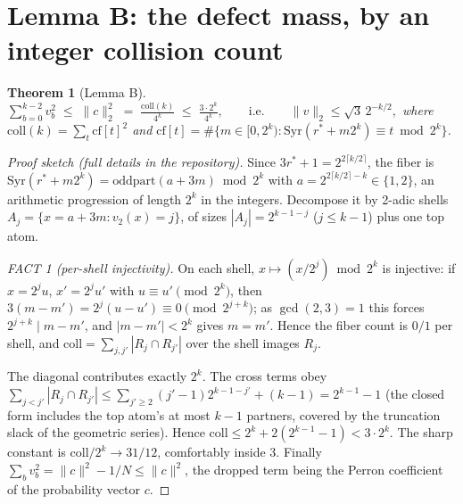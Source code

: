 \documentclass[12pt,a4paper]{article}
\newtheorem{theorem}{Theorem}[section]
\newcommand{\Syr}{\mathrm{Syr}}
\newcommand{\vtwo}{v_2}
\begin{document}
\section{Lemma B: the defect mass, by an integer collision count}\label{sec:lemmaB}

\begin{theorem}[Lemma B]\label{thm:lemmaB}
$\displaystyle \sum_{b=0}^{k-2} v_b^2 \;\le\; \|c\|_2^2 \;=\; \frac{\mathrm{coll}(k)}{4^k}
\;\le\; \frac{3 \cdot 2^k}{4^k}, \qquad\text{i.e.}\qquad \|v\|_2 \le \sqrt{3}\, 2^{-k/2},$
where $\mathrm{coll}(k) = \sum_t \mathrm{cf}[t]^2$ and
$\mathrm{cf}[t] = \#\{m \in [0,2^k) : \Syr(r^\ast + m 2^k) \equiv t \bmod 2^k\}$.
\end{theorem}

\begin{proof}[Proof sketch (full details in the repository)]
Since $3r^\ast + 1 = 2^{2\lceil k/2\rceil}$, the fiber is
$\Syr(r^\ast + m2^k) = \mathrm{oddpart}(a + 3m) \bmod 2^k$ with
$a = 2^{2\lceil k/2\rceil - k} \in \{1, 2\}$, an arithmetic progression of length $2^k$ in the
integers. Decompose it by 2-adic shells $A_j = \{x = a + 3m : \vtwo(x) = j\}$, of sizes
$|A_j| = 2^{k-1-j}$ ($j \le k-1$) plus one top atom.

\emph{FACT 1 (per-shell injectivity).} On each shell, $x \mapsto (x/2^j) \bmod 2^k$ is
injective: if $x = 2^j u$, $x' = 2^j u'$ with $u \equiv u' \pmod{2^k}$, then
$3(m - m') = 2^j(u - u') \equiv 0 \pmod{2^{j+k}}$; as $\gcd(2,3)=1$ this forces
$2^{j+k} \mid m - m'$, and $|m - m'| < 2^k$ gives $m = m'$. Hence the fiber count is $0/1$ per
shell, and $\mathrm{coll} = \sum_{j,j'} |R_j \cap R_{j'}|$ over the shell images $R_j$.

The diagonal contributes exactly $2^k$. The cross terms obey
$\sum_{j < j'} |R_j \cap R_{j'}| \le \sum_{j' \ge 2} (j'-1) 2^{k-1-j'} + (k-1) = 2^{k-1} - 1$
(the closed form includes the top atom's at most $k-1$ partners, covered by the truncation slack
of the geometric series). Hence $\mathrm{coll} \le 2^k + 2(2^{k-1} - 1) < 3 \cdot 2^k$. The
sharp constant is $\mathrm{coll}/2^k \to 31/12$, comfortably inside 3. Finally
$\sum_b v_b^2 = \|c\|^2 - 1/N \le \|c\|^2$, the dropped term being the Perron coefficient of the
probability vector $c$.
\end{proof}

\end{document}

